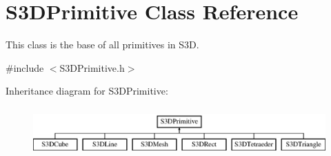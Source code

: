 \hypertarget{class_s3_d_primitive}{
\section{S3DPrimitive Class Reference}
\label{class_s3_d_primitive}
}


This class is the base of all primitives in S3D.  




{\ttfamily \#include $<$S3DPrimitive.h$>$}

Inheritance diagram for S3DPrimitive:\begin{figure}[H]
\begin{center}
\leavevmode
\includegraphics[height=1.88552cm]{class_s3_d_primitive}
\end{center}
\end{figure}
